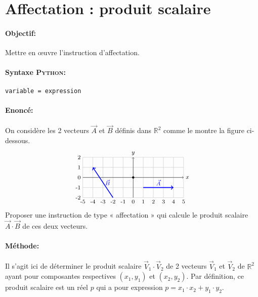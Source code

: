 \documentclass[11pt,a4paper,colorlinks,breaklinks]{article}
\def\python{\textsc{Python}}
\begin{document}

\newpage
\section{Affectation : produit scalaire}\label{maths:affectation}
\paragraph{Objectif:} Mettre en \oe uvre l'instruction d'affectation.

\paragraph{Syntaxe \python:} \texttt{variable = expression}

\begin{framed}
\paragraph{Enoncé:}
On considère les 2 vecteurs $\vec{A}$ et $\vec{B}$ définis dans $\mathbb{R}^2$ 
comme le montre la figure ci-dessous.
$$
\begin{tikzpicture}[scale=0.5]\footnotesize
\draw[color=lightgray](-5,-2) grid[xstep=1,ystep=1] (5,2);
\foreach \x in {-5,-4,...,5} \draw(\x,-2) node[below]{\x};
\foreach \y in {-2,-1,...,2} \draw(-5,\y) node[left]{\y};
\filldraw(0,0) circle (0.1);
\draw[->] (-5,0) -- (5,0);
\draw (5,0) node[right]{$x$} ;
\draw[->] (0,-2) -- (0,2);
\draw (0,2) node[above]{$y$};
\draw[->,very thick,color=blue] (1,-1) -- (4,-1);
\draw[->,very thick,color=blue] (-2,-2) -- (-4,1);
\draw (2.5,-1) node[above,color=blue]{$\vec{A}$};
\draw (-3,-0.5) node[right,color=blue]{$\vec{B}$};
\end{tikzpicture}
$$
Proposer une instruction de type « affectation » qui calcule le produit scalaire
$\vec{A}\cdot\vec{B}$ de ces deux vecteurs.
\end{framed}

\paragraph{Méthode:} 
Il s'agit ici de déterminer le produit scalaire $\vec{V}_1\cdot\vec{V}_2$ 
de 2 vecteurs $\vec{V}_1$ et $\vec{V}_2$ de $\mathbb{R}^2$
ayant pour composantes respectives $(x_1,y_1)$ et $(x_2,y_2)$. 
Par définition, ce produit scalaire est un réel $p$ qui a pour expression 
$p = x_1\cdot x_2 + y_1\cdot y_2$.
\end{document}
